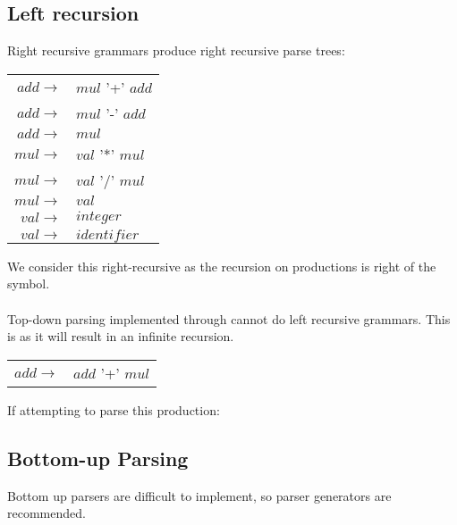 \documentclass{report}
\begin{document}
                \subsection*{Left recursion}
                    Right recursive grammars produce right recursive parse trees:
                    \begin{center}
                        \begin{tabular}{r l }
                            $add \to$ & $mul$ '+' $add$ \\
                            $add \to$ & $mul$ '-' $add$ \\
                            $add \to$ & $mul$ \\
                            $mul \to$ & $val$ '*' $mul$ \\
                            $mul \to$ & $val$ '/' $mul$ \\
                            $mul \to$ & $val$ \\
                            $val \to$ & $integer$ \\
                            $val \to$ & $identifier$ \\
                        \end{tabular}    
                    \end{center}
                    We consider this right-recursive as the recursion on productions is right of the symbol.
                    \\
                    \\ Top-down parsing implemented through  cannot do left recursive grammars. This is as it will result in an infinite recursion.
                    \begin{center}
                        \begin{tabular}{r l }
                            $add \to$ & $add$ '+' $mul$ \\
                        \end{tabular}
                    \end{center}
                    If attempting to parse this production:

        \subsection*{Bottom-up Parsing}
            Bottom up parsers are difficult to implement, so parser generators are recommended.
    
\end{document}
